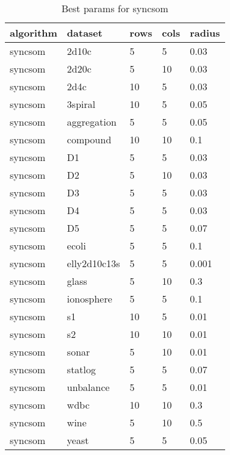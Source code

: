 \begin{table}[H]
\centering
\caption{Best params for syncsom}
\label{S46_Table}
\begin{tabular}{|l|l|l|l|l|}
\hline
algorithm & dataset & rows & cols & radius \\
\hline
syncsom & 2d10c & 5 & 5 & 0.03 \\
\hline
syncsom & 2d20c & 5 & 10 & 0.03 \\
\hline
syncsom & 2d4c & 10 & 5 & 0.03 \\
\hline
syncsom & 3spiral & 10 & 5 & 0.05 \\
\hline
syncsom & aggregation & 5 & 5 & 0.05 \\
\hline
syncsom & compound & 10 & 10 & 0.1 \\
\hline
syncsom & D1 & 5 & 5 & 0.03 \\
\hline
syncsom & D2 & 5 & 10 & 0.03 \\
\hline
syncsom & D3 & 5 & 5 & 0.03 \\
\hline
syncsom & D4 & 5 & 5 & 0.03 \\
\hline
syncsom & D5 & 5 & 5 & 0.07 \\
\hline
syncsom & ecoli & 5 & 5 & 0.1 \\
\hline
syncsom & elly2d10c13s & 5 & 5 & 0.001 \\
\hline
syncsom & glass & 5 & 10 & 0.3 \\
\hline
syncsom & ionosphere & 5 & 5 & 0.1 \\
\hline
syncsom & s1 & 10 & 5 & 0.01 \\
\hline
syncsom & s2 & 10 & 10 & 0.01 \\
\hline
syncsom & sonar & 5 & 10 & 0.01 \\
\hline
syncsom & statlog & 5 & 5 & 0.07 \\
\hline
syncsom & unbalance & 5 & 5 & 0.01 \\
\hline
syncsom & wdbc & 10 & 10 & 0.3 \\
\hline
syncsom & wine & 5 & 10 & 0.5 \\
\hline
syncsom & yeast & 5 & 5 & 0.05 \\
\hline
\end{tabular}
\end{table}

\clearpage

